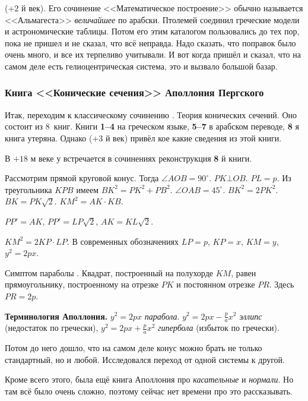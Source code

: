 \documentclass[a4paper,oneside,fleqn,10pt]{article}
\begin{document}
 ($+2$ й век).
Его сочинение <<Математическое построение>> обычно называется <<Альмагеста>>
\emph{величайшее} по арабски. Птолемей соединил греческие модели и астрономические
таблицы. Потом его этим каталогом пользовались до тех пор, пока 
не пришел и не сказал, что всё неправда.
Надо сказать, что поправок было очень много, и все их терпеливо учитывали.
И вот когда  пришёл и сказал, что на самом деле есть гелиоцентрическая система,
это и вызвало большой базар.

\subsubsection{Книга <<Конические сечения>> Аполлония Пергского}

Итак, переходим к классическому сочинению . Теория конических сечений.
Оно состоит из 8~книг. Книги \textbf{1--4} на греческом языке, \textbf{5--7}
в арабском  переводе, \textbf{8} я книга утеряна.
Однако  ($+3$ й век) привёл кое какие сведения из этой книги.

В $+18$ м веке у  встречается в сочинениях реконструкция \textbf{8} й книги.

Рассмотрим прямой круговой конус. Тогда
$\angle AOB = 90^\circ$. $PK \bot OB$. $PL = p$.
Из треугольника $KPB$ имеем $BK^2 = PK^2 + PB^2$.
$\angle OAB = 45^\circ$. $BK^2 = 2PK^2$. $BK = PK\sqrt2$.
$KM^2 = AK\cdot KB$.


$PP' = AK$, $PP' = LP\sqrt2$, $AK = KL\sqrt2$.

$KM^2 = 2KP\cdot LP$. В современных обозначениях $LP = p$,
$KP = x$, $KM = y$,
$y^2 = 2px$.

Симптом параболы .
Квадрат, построенный на полухорде $KM$, равен прямоугольнику,
построенному на отрезке $PK$ и постоянном отрезке $PR$.
Здесь $PR = 2p$.

\textbf{Терминология Аполлония.}
$y^2 = 2px$ \emph{парабола}.
$y^2 = 2px - \frac pa x^2$ \emph{эллипс} (недостаток по гречески),
$y^2 = 2px + \frac pa x^2$ \emph{гипербола} (избыток по гречески).

Потом до него дошло, что на самом деле конус можно брать не только
стандартный, но и любой. Исследовался переход от одной системы к другой.

Кроме всего этого, была ещё книга Аполлония про \emph{касательные} и \emph{нормали}.
Но там всё было очень сложно, поэтому сейчас нет времени про это рассказывать.
\end{document}

